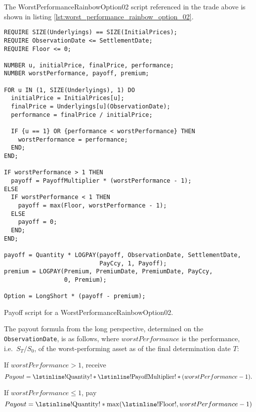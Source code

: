 The WorstPerformanceRainbowOption02 script referenced in the trade above is shown in listing
\ref{lst:worst_performance_rainbow_option_02}.

\begin{listing}[hbt]
\begin{verbatim}
REQUIRE SIZE(Underlyings) == SIZE(InitialPrices);
REQUIRE ObservationDate <= SettlementDate;
REQUIRE Floor <= 0;

NUMBER u, initialPrice, finalPrice, performance;
NUMBER worstPerformance, payoff, premium;

FOR u IN (1, SIZE(Underlyings), 1) DO
  initialPrice = InitialPrices[u];
  finalPrice = Underlyings[u](ObservationDate);
  performance = finalPrice / initialPrice;

  IF {u == 1} OR {performance < worstPerformance} THEN
    worstPerformance = performance;
  END;
END;

IF worstPerformance > 1 THEN
  payoff = PayoffMultiplier * (worstPerformance - 1);
ELSE
  IF worstPerformance < 1 THEN
    payoff = max(Floor, worstPerformance - 1);
  ELSE
    payoff = 0;
  END;
END;

payoff = Quantity * LOGPAY(payoff, ObservationDate, SettlementDate,
                           PayCcy, 1, Payoff);
premium = LOGPAY(Premium, PremiumDate, PremiumDate, PayCcy,
                 0, Premium);

Option = LongShort * (payoff - premium);
\end{verbatim}
\caption{Payoff script for a WorstPerformanceRainbowOption02.}
\label{lst:worst_performance_rainbow_option_02}
\end{listing}

The payout formula from the long perspective, determined on the \lstinline!ObservationDate!,
is as follows, where $worstPerformance$ is the performance, i.e.\ $S_T/S_0$, of the
worst-performing asset as of the final determination date $T$:

If $worstPerformance > 1$, receive
\begin{equation*}
  Payout = \text{\lstinline!Quantity!} * \text{\lstinline!PayoffMultiplier!} * (worstPerformance - 1).
\end{equation*}

If $worstPerformance \leq 1$, pay
\begin{equation*}
  Payout = \text{\lstinline!Quantity!} * \max(\text{\lstinline!Floor!}, worstPerformance - 1)
\end{equation*}

